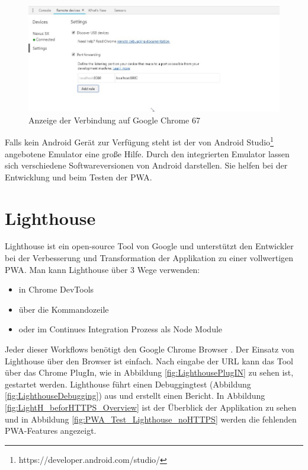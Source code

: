 \begin{figure}[h]
	\centering
	\includegraphics[width=14cm]{BilderAllgemein/DevToolsChrome}\medskip
	\caption{Anzeige der Verbindung auf Google Chrome 67}
	\label{fig:DevToolsChrome}
\end{figure}
\newpage
Falls kein Android Gerät zur Verfügung steht ist der von Android Studio\footnote{https://developer.android.com/studio/} angebotene Emulator eine große Hilfe. Durch den integrierten Emulator lassen sich verschiedene Softwareversionen von Android darstellen. Sie helfen bei der Entwicklung und beim Testen der \acs{PWA}.
\newpage
\section{Lighthouse}
Lighthouse ist ein open-source Tool von Google und unterstützt den Entwickler bei der Verbesserung und Transformation der Applikation zu einer vollwertigen \acs{PWA}. Man kann Lighthouse über 3 Wege verwenden:
\begin{itemize}
    \item  in Chrome DevTools
	\item  über die Kommandozeile
	\item  oder im Continues Integration Prozess als Node Module
\end{itemize}
Jeder dieser Workflows benötigt den Google Chrome Browser \cite{Lighthouse}.
Der Einsatz von Lighthouse über den Browser ist einfach. Nach eingabe der URL kann das Tool über das Chrome PlugIn, wie in Abbildung \ref{fig:LighthousePlugIN} zu sehen ist, gestartet werden. Lighthouse führt einen Debuggingtest (Abbildung \ref{fig:LighthouseDebugging}) aus und erstellt einen Bericht. In Abbildung \ref{fig:LightH_beforHTTPS_Overview} ist der Überblick der Applikation zu sehen und in Abbildung \ref{fig:PWA_Test_Lighthouse_noHTTPS} werden die fehlenden PWA-Features angezeigt.

